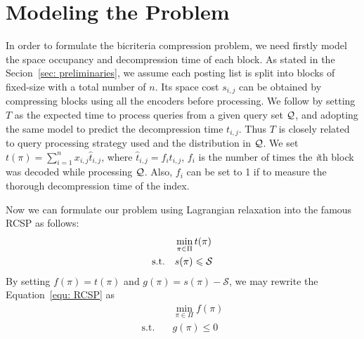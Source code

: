 \documentclass{sig-alternate-05-2015}
\begin{document}

\section{Modeling the Problem}\label{sec: model}
In order to formulate the bicriteria compression problem, we need firstly model the space occupancy and decompression time of each block.
As stated in the Secion~\ref{sec: preliminaries}, we assume each posting list is split into blocks of fixed-size with a total number of $ n $.
Its space cost $ s_{i,j} $ can be obtained by compressing blocks using all the encoders before processing.
We follow \cite{ottaviano2015optimal} by setting $ T $ as the expected time to process queries from a given query set $ \cal Q $, and adopting the same model to predict the decompression time $ t_{i,j} $.
Thus $ T $ is closely related to query processing strategy used and the distribution in $ \cal Q $.
We set $ t(\pi) = \sum_{i=1}^{n}x_{i,j}\hat{t}_{i,j} $, where $ \hat{t}_{i,j}=f_i t_{i,j} $, $ f_i $ is the number of times the \textit{i}th block was decoded while processing $ \cal Q $.
Also, $ f_i $ can be set to 1 if to measure the thorough decompression time of the index.

Now we can formulate our problem using Lagrangian relaxation into the famous RCSP as follows:
\begin{align}
 & \min_{\pi \in \Pi} t(\pi) \notag \\
 \text{s.t.}\quad & s(\pi) \leqslant \cal S \label{equ: RCSP}
\end{align}
By setting $ f(\pi) = t(\pi) $ and $ g(\pi) = s(\pi)- \mathcal{S} $, we may rewrite the Equation~\eqref{equ: RCSP} as
\begin{align*}
& \min_{\pi \in \Pi} f(\pi) \\
\text{s.t.}\quad & g(\pi) \leqslant 0
\end{align*}
\end{document}

